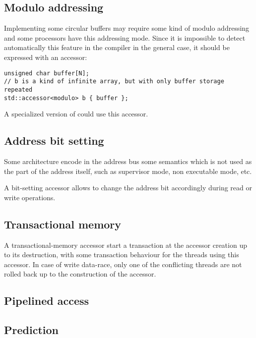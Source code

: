 \documentclass[a4paper]{article}
\begin{document}
\subsection{Modulo addressing}
\label{sec:modulo-addressing}

Implementing some circular buffers may require some kind of modulo
addressing and some processors have this addressing mode. Since it is
impossible to detect automatically this feature in the compiler in the
general case, it should be expressed with an accessor:
\begin{lstlisting}
unsigned char buffer[N];
// b is a kind of infinite array, but with only buffer storage repeated
std::accessor<modulo> b { buffer };
\end{lstlisting}
A specialized version of \cite{C++:P0059R1:ring} could use this
accessor.


\subsection{Address bit setting}
\label{sec:address-bit-setting}

Some architecture encode in the address bus some semantics which is
not used as the part of the address itself, such as supervisor mode,
non executable mode, etc.

A bit-setting accessor allows to change the address bit accordingly
during read or write operations.


\subsection{Transactional memory}
\label{sec:transactional-memory}

A transactional-memory accessor start a transaction at the accessor
creation up to its destruction, with some transaction behaviour for
the threads using this accessor. In case of write data-race, only one
of the conflicting threads are not rolled back up to the construction
of the accessor.


\subsection{Pipelined access}
\label{sec:pipelined-access}


\subsection{Prediction}
\label{sec:prediction}
\end{document}
